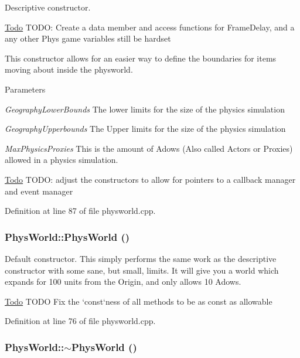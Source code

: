Descriptive constructor. \begin{Desc}
\item[\hyperlink{todo__todo000012}{Todo}]TODO: Create a data member and access functions for FrameDelay, and a any other Phys game variables still be hardset \end{Desc}


This constructor allows for an easier way to define the boundaries for items moving about inside the physworld. 
\begin{DoxyParams}{Parameters}
\item[{\em GeographyLowerBounds}]The lower limits for the size of the physics simulation \item[{\em GeographyUpperbounds}]The Upper limits for the size of the physics simulation \item[{\em MaxPhysicsProxies}]This is the amount of Adows (Also called Actors or Proxies) allowed in a physics simulation.\end{DoxyParams}
\begin{Desc}
\item[\hyperlink{todo__todo000007}{Todo}]TODO: adjust the constructors to allow for pointers to a callback manager and event manager \end{Desc}


Definition at line 87 of file physworld.cpp.\hypertarget{classPhysWorld_a6ded8026b0cd72e7877830698197adf0}{
\subsubsection[{PhysWorld}]{\setlength{\rightskip}{0pt plus 5cm}PhysWorld::PhysWorld ()}}
\label{db/df5/classPhysWorld_a6ded8026b0cd72e7877830698197adf0}


Default constructor. This simply performs the same work as the descriptive constructor with some sane, but small, limits. It will give you a world which expands for 100 units from the Origin, and only allows 10 Adows.

\begin{Desc}
\item[\hyperlink{todo__todo000006}{Todo}]TODO Fix the `const`ness of all methods to be as const as allowable \end{Desc}


Definition at line 76 of file physworld.cpp.\hypertarget{classPhysWorld_acdfe3b4c1c236860dc7dff945cfe5b07}{
\subsubsection[{$\sim$PhysWorld}]{\setlength{\rightskip}{0pt plus 5cm}PhysWorld::$\sim$PhysWorld ()}}
\label{db/df5/classPhysWorld_acdfe3b4c1c236860dc7dff945cfe5b07}


